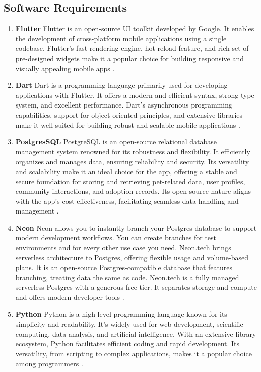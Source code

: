 \subsection{Software Requirements}
\begin{enumerate}
    \item 
    \textbf{Flutter} Flutter is an open-source UI toolkit developed by Google. It enables the development of cross-platform mobile applications using a single codebase. Flutter's fast rendering engine, hot reload feature, and rich set of pre-designed widgets make it a popular choice for building responsive and visually appealing mobile apps \cite{14}. 
     
    \item\textbf{Dart} Dart is a programming language primarily used for developing applications with Flutter. It offers a modern and efficient syntax, strong type system, and excellent performance. Dart's asynchronous programming capabilities, support for object-oriented principles, and extensive libraries make it well-suited for building robust and scalable mobile applications \cite{15}. 
     
    \item\textbf{PostgresSQL} 
    PostgreSQL is an open-source relational database management system renowned for its robustness and flexibility. It efficiently organizes and manages data, ensuring reliability and security. Its versatility and scalability make it an ideal choice for the app, offering a stable and secure foundation for storing and retrieving pet-related data, user profiles, community interactions, and adoption records. Its open-source nature aligns with the app's cost-effectiveness, facilitating seamless data handling and management \cite{16}.
    
    
    \item\textbf{Neon}
    Neon allows you to instantly branch your Postgres database to support modern development workflows. You can create branches for test environments and for every other use case you need. Neon.tech brings serverless architecture to Postgres, offering flexible usage and volume-based plans. It is an open-source Postgres-compatible database that features branching, treating data the same as code. Neon.tech is a fully managed serverless Postgres with a generous free tier. It separates storage and compute and offers modern developer tools \cite{17}.
    
    \item\textbf{Python} Python is a high-level programming language known for its simplicity and readability. It's widely used for web development, scientific computing, data analysis, and artificial intelligence. With an extensive library ecosystem, Python facilitates efficient coding and rapid development. Its versatility, from scripting to complex applications, makes it a popular choice among programmers \cite{18}.
    

\end{enumerate}
